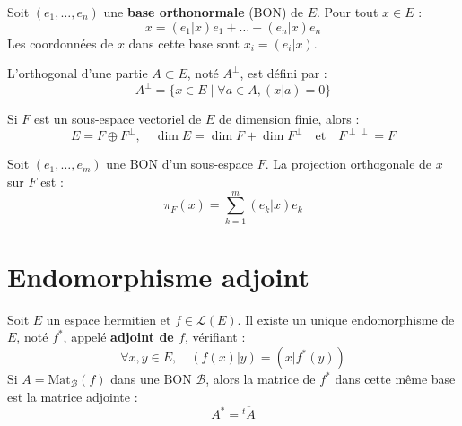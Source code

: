 \documentclass[french]{yLectureNote}
\begin{document}

\begin{proposition}
    Soit $(e_1, \dots, e_n)$ une \textbf{base orthonormale} (BON) de $E$. Pour tout $x \in E$ :
    $$x = (e_1|x)e_1 + \dots + (e_n|x)e_n$$
    Les coordonnées de $x$ dans cette base sont $x_i = (e_i|x)$. 
\end{proposition}



\begin{definition}
    L'orthogonal d'une partie $A \subset E$, noté $A^\perp$, est défini par :
    $$A^\perp = \{x \in E \mid \forall a \in A, (x|a) = 0\}$$
\end{definition}

\begin{proposition}
    Si $F$ est un sous-espace vectoriel de $E$ de dimension finie, alors :
    $$E = F \oplus F^\perp, \quad \dim E = \dim F + \dim F^\perp \quad \text{et} \quad F^{\perp\perp} = F$$
\end{proposition}

\begin{proposition}
    Soit $(e_1, \dots, e_m)$ une BON d'un sous-espace $F$. La projection orthogonale de $x$ sur $F$ est :
    $$\pi_F(x) = \sum_{k=1}^m (e_k|x)e_k$$
\end{proposition}

\section{Endomorphisme adjoint}

\begin{definition}
    Soit $E$ un espace hermitien et $f \in \mathcal{L}(E)$. Il existe un unique endomorphisme de $E$, noté $f^*$, appelé \textbf{adjoint de $f$}, vérifiant :
    $$\forall x, y \in E, \quad (f(x)|y) = (x|f^*(y))$$
    Si $A = \text{Mat}_{\mathcal{B}}(f)$ dans une BON $\mathcal{B}$, alors la matrice de $f^*$ dans cette même base est la matrice adjointe :
    $$A^* = \overline{{}^tA}$$
\end{definition}
\end{document}
